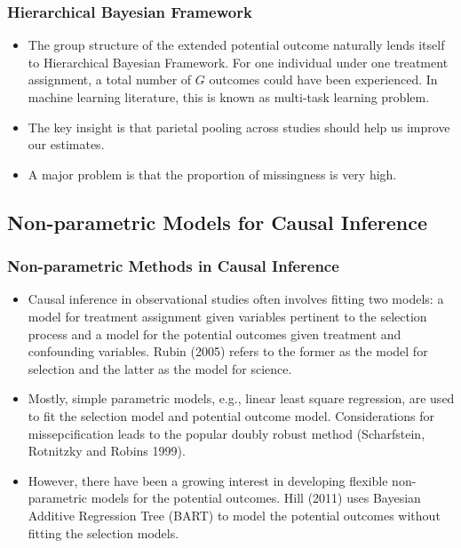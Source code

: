 \documentclass[xetex,mathserif,serif]{beamer}
\begin{document}
\begin{frame}
  \frametitle{Hierarchical Bayesian Framework}
  \begin{itemize}
  \item The group structure of the extended potential outcome naturally lends
    itself to Hierarchical Bayesian Framework. For one individual under one
    treatment assignment, a total number of $G$ outcomes could have been
    experienced. In machine learning literature, this is known as multi-task
    learning problem.
    \pause
  \item The key insight is that parietal pooling across studies should help us
    improve our estimates.
    \pause
  \item A major problem is that the proportion of missingness is very high.
  \end{itemize}
\end{frame}

\subsection{Non-parametric Models for Causal Inference}
\begin{frame}
  \frametitle{Non-parametric Methods in Causal Inference}
  \begin{itemize}
  \item Causal inference in observational studies often involves fitting two
    models: a model for treatment assignment given variables pertinent to the
    selection process and a model for the potential outcomes given treatment and
    confounding variables. Rubin (2005) refers to the former as the model for
    selection and the latter as the model for science.
    \pause
  \item Mostly, simple parametric models, e.g., linear least square regression,
    are used to fit the selection model and potential outcome
    model. Considerations for missepcification leads to the popular doubly robust
    method (Scharfstein, Rotnitzky and Robins 1999).  
    \pause
  \item However, there have been a growing interest in developing flexible
    non-parametric models for the potential outcomes. Hill (2011) uses Bayesian
    Additive Regression Tree (BART) to model the potential outcomes without fitting the
    selection models.
  \end{itemize}
\end{frame}
\end{document}
